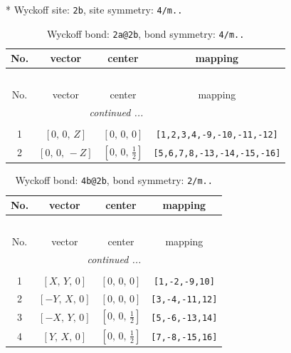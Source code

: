 \documentclass[fleqn,8pt]{jsarticle}
\begin{document}
* Wyckoff site: {\tt 2b}, site symmetry: {\tt 4/m..}
\renewcommand{\arraystretch}{1.2}
\begin{longtable}{cccc}
\caption{Wyckoff bond: {\tt 2a@2b}, bond symmetry: {\tt 4/m..}}
 \\
 \hline \hline
No. & vector & center & mapping \\ \hline \endfirsthead

\multicolumn{3}{l}{\tablename\ \thetable{}} \\
 \hline \hline
No. & vector & center & mapping \\ \hline \endhead

 \hline \hline
\multicolumn{3}{r}{\footnotesize\it continued ...} \\ \endfoot

 \hline \hline
\multicolumn{3}{r}{} \\ \endlastfoot

1 & $\left[ 0,\, 0,\, Z \right]$ & $\left[ 0,\, 0,\, 0 \right]$ & {\tt [1,2,3,4,-9,-10,-11,-12]} \\ \hline
2 & $\left[ 0,\, 0,\, - Z \right]$ & $\left[ 0,\, 0,\, \frac{1}{2} \right]$ & {\tt [5,6,7,8,-13,-14,-15,-16]} \\
\end{longtable}
\renewcommand{\arraystretch}{1.2}
\begin{longtable}{cccc}
\caption{Wyckoff bond: {\tt 4b@2b}, bond symmetry: {\tt 2/m..}}
 \\
 \hline \hline
No. & vector & center & mapping \\ \hline \endfirsthead

\multicolumn{3}{l}{\tablename\ \thetable{}} \\
 \hline \hline
No. & vector & center & mapping \\ \hline \endhead

 \hline \hline
\multicolumn{3}{r}{\footnotesize\it continued ...} \\ \endfoot

 \hline \hline
\multicolumn{3}{r}{} \\ \endlastfoot

1 & $\left[ X,\, Y,\, 0 \right]$ & $\left[ 0,\, 0,\, 0 \right]$ & {\tt [1,-2,-9,10]} \\ \hline
2 & $\left[ - Y,\, X,\, 0 \right]$ & $\left[ 0,\, 0,\, 0 \right]$ & {\tt [3,-4,-11,12]} \\ \hline
3 & $\left[ - X,\, Y,\, 0 \right]$ & $\left[ 0,\, 0,\, \frac{1}{2} \right]$ & {\tt [5,-6,-13,14]} \\ \hline
4 & $\left[ Y,\, X,\, 0 \right]$ & $\left[ 0,\, 0,\, \frac{1}{2} \right]$ & {\tt [7,-8,-15,16]} \\
\end{longtable}
\end{document}
